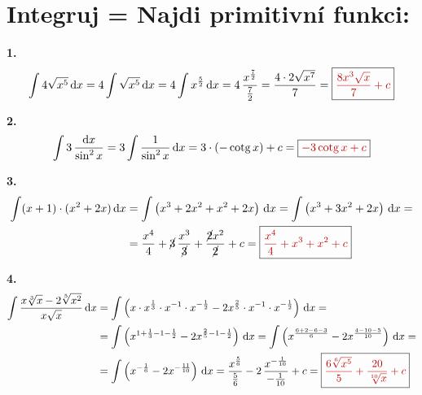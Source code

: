 \documentclass[11pt,a4paper,fleqn]{article}
\newcommand{\tm}[2]{\tikz[remember picture, baseline=(#1.base)]\node[inner sep=0pt, outer sep=1pt] (#1) {$\displaystyle #2$};}
\newcommand{\vysl}[1]{\boxed{\color{red!75!black}#1}}
\newcommand{\dx}{\,\mathrm{d}x}
\begin{document}
\section*{Integruj = Najdi primitivní funkci:}

\textbf{1.}
\[
\int 4\sqrt{x^5}\dx = 4\int\sqrt{x^5}\dx = 4\int x^{\frac52}\dx
= 4\,\frac{x^{\frac72}}{\frac72} = \frac{4\cdot2\sqrt{x^7}}{7}
= \vysl{\frac{8x^3\sqrt{x}}{7}+c}
\]

\textbf{2.}
\[
\int 3\,\frac{\mathrm{d}x}{\sin^2x} = 3\int\frac{1}{\sin^2x}\dx
= 3\cdot(-\operatorname{cotg}x)+c = \vysl{-3\operatorname{cotg}x+c}
\]

\textbf{3.}
\begin{align*}
\int (x+1)\cdot(x^2+2x)\dx &= \int\left(x^3+2x^2+x^2+2x\right)\dx = \int\left(x^3+3x^2+2x\right)\dx =\\
&= \frac{x^4}{4}+\cancel{3}\,\frac{x^3}{\cancel{3}}+\frac{\cancel{2}x^2}{\cancel{2}}+c = \vysl{\frac{x^4}{4}+x^3+x^2+c}
\end{align*}

\textbf{4.}
\begin{align*}
\int \frac{\tm{n1}{x\sqrt[3]{x}}-\tm{n2}{2\sqrt[5]{x^2}}}{\tm{dd}{x\sqrt{x}}}\dx
&= \int\left(x\cdot x^{\frac13}\cdot x^{-1}\cdot x^{-\frac12} - 2x^{\frac25}\cdot x^{-1}\cdot x^{-\frac12}\right)\dx =\\
&= \int\left(x^{1+\frac13-1-\frac12} - 2x^{\frac25-1-\frac12}\right)\dx
= \int\left(x^{\frac{6+2-6-3}{6}} - 2x^{\frac{4-10-5}{10}}\right)\dx =\\
&= \int\left(\tm{e1}{x^{-\frac16}} - 2\tm{e2}{x^{-\frac{11}{10}}}\right)\dx
= \frac{x^{\frac56}}{\frac56} - 2\,\frac{x^{-\frac1{10}}}{-\frac1{10}} + c
= \vysl{\frac{6\sqrt[6]{x^5}}{5} + \frac{20}{\sqrt[10]{x}} + c}
\end{align*}
\vspace{1.0cm}
\end{document}
